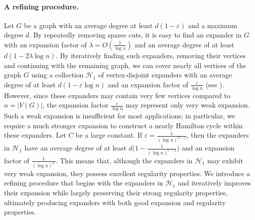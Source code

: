 \documentclass[10pt]{article}
\theoremstyle{plain}
\numberwithin{theorem}{section}
\theoremstyle{definition}
\theoremstyle{remark}
\newcommand{\cH}{\mathcal{H}}
\newcommand{\eps}{\varepsilon}
\theoremstyle{plain}
\begin{document}
\vspace{-4 mm}
\paragraph{A refining procedure.}  Let $G$ be a graph with an average degree at least $d(1 - \eps)$ and a maximum degree $d$. By repeatedly removing sparse cuts, it is easy to find an expander in $G$ with an expansion factor of $\lambda = O(\frac{1}{\log n})$ and an average degree of at least $d(1 - 2 \lambda \log n)$. By iteratively finding such expanders, removing their vertices and continuing with the remaining graph, we can cover nearly all vertices
of the graph $G$ using a collection $\cH_1$ of vertex-disjoint expanders with an average degree of at least $d(1 - \eps \log n)$ and an expansion factor of $\frac{\eps}{\log n}$ (see ). 
However, since these expanders may contain very few vertices compared to $n = |V(G)|$, the expansion factor $\frac{\eps}{\log n}$ may represent only very weak expansion. Such a weak expansion is insufficient for most applications; in particular, we require a much stronger expansion to construct a nearly Hamilton cycle within these expanders. Let $C$ be a large constant. If $\eps = \frac{1}{(\log n)^{C-1}}$, then the expanders in $\cH_1$ have an average degree of at least $d\big(1 - \frac{1}{(\log n)^{C-2}}\big)$ and an expansion factor of $\frac{1}{(\log n)^C}$. This means that, although the expanders in $\cH_1$ may exhibit very weak expansion, they possess excellent regularity properties. We introduce a refining procedure that begins with the expanders in $\cH_1$ and iteratively improves their expansion while largely preserving their strong regularity properties, ultimately producing expanders with both good expansion and regularity properties. 
 
\end{document}
